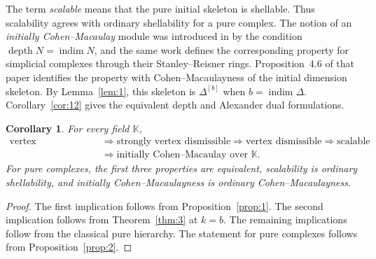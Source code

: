 \documentclass[11pt]{amsart}
\newcommand{\K}{\mathbb K}
\DeclareMathOperator{\indim}{indim}
\DeclareMathOperator{\depth}{depth}
\newtheorem{corollary}[theorem]{Corollary}
\theoremstyle{definition}
\begin{document}
	The term \emph{scalable} means that the pure initial skeleton is shellable. Thus scalability agrees with ordinary shellability for a pure complex. The notion of an \emph{initially Cohen--Macaulay} module was introduced in \cite{Namiq2026ICM} by the condition $\depth N=\indim N$, and the same work defines the corresponding property for simplicial complexes through their Stanley--Reisner rings. Proposition~4.6 of that paper identifies the property with Cohen--Macaulayness of the initial dimension skeleton. By Lemma~\ref{lem:1}, this skeleton is $\Delta^{[b]}$ when $b=\indim\Delta$. Corollary~\ref{cor:12} gives the equivalent depth and Alexander dual formulations.
	
	\begin{corollary}\label{cor:2}
		For every field $\K$,
		\[
		\begin{split}
			\text{vertex decomposable}
			&\Longrightarrow \text{strongly vertex dismissible}
			\Longrightarrow \text{vertex dismissible}\Longrightarrow \text{scalable}\\
			&\Longrightarrow \text{initially Cohen--Macaulay over }\K.
		\end{split}
		\]
		For pure complexes, the first three properties are equivalent, scalability is ordinary shellability, and initially Cohen--Macaulayness is ordinary Cohen--Macaulayness.
	\end{corollary}
	
	\begin{proof}
		The first implication follows from Proposition~\ref{prop:1}.  The second implication follows from Theorem~\ref{thm:3} at $k=b$.  The remaining implications follow from the classical pure hierarchy.  The statement for pure complexes follows from Proposition~\ref{prop:2}.
	\end{proof}
	
\end{document}
